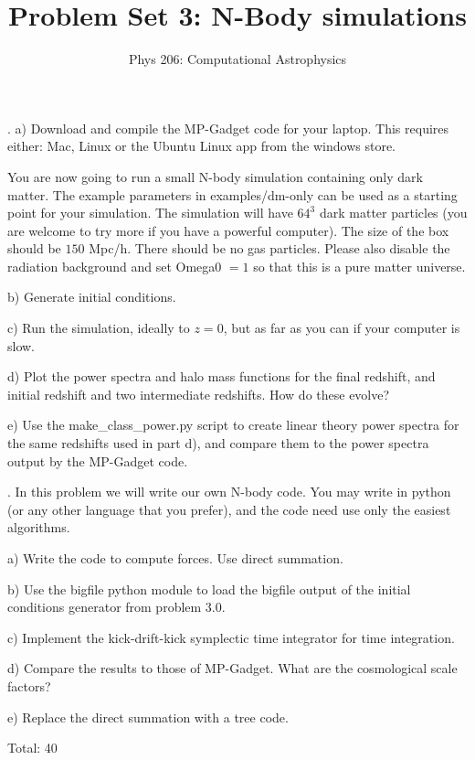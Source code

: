 \documentclass[10pt]{article}
\newenvironment{problem}[2][Problem]{\begin{trivlist}
\item[\hskip \labelsep {\bfseries #1}\hskip \labelsep {\bfseries #2}]}{\end{trivlist}}
\begin{document}
\title{Problem Set 3: N-Body simulations}
\author{Phys 206: Computational Astrophysics}
\maketitle

\begin{problem}{3.0 Run an MP-Gadget Simulation (20)}.
a) Download and compile the MP-Gadget code for your laptop. This requires either: Mac, Linux or the Ubuntu Linux app from the windows store.

You are now going to run a small N-body simulation containing only dark matter. The example parameters in examples/dm-only can be used as a starting point for your simulation. The simulation will have $64^3$ dark matter particles (you are welcome to try more if you have a powerful computer). The size of the box should be $150$ Mpc/h. There should be no gas particles. Please also disable the radiation background and set Omega0 $= 1$ so that this is a pure matter universe.

b) Generate initial conditions.

c) Run the simulation, ideally to $z=0$, but as far as you can if your computer is slow.

d) Plot the power spectra and halo mass functions for the final redshift, and initial redshift and two intermediate redshifts. How do these evolve?

e) Use the make\_class\_power.py script to create linear theory power spectra for the same redshifts used in part d), and compare them to the power spectra output by the MP-Gadget code.
\end{problem}

\begin{problem}{3.1 Write your own N-body code (20)}.
In this problem we will write our own N-body code. You may write in python (or any other language that you prefer), and the code need use only the easiest algorithms.

a) Write the code to compute forces. Use direct summation.

b) Use the bigfile python module to load the bigfile output of the initial conditions generator from problem 3.0.

c) Implement the kick-drift-kick symplectic time integrator for time integration.

d) Compare the results to those of MP-Gadget. What are the cosmological scale factors?

e) Replace the direct summation with a tree code.
\end{problem}


Total: 40
\end{document}
